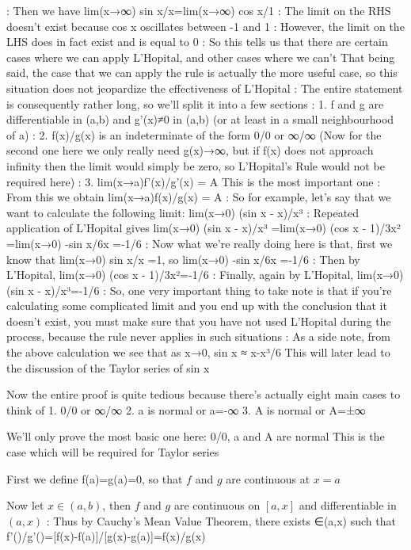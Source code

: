:
Then we have
lim(x→∞) sin x/x=lim(x→∞) cos x/1
:
The limit on the RHS doesn't exist because cos x oscillates between -1 and 1
:
However, the limit on the LHS does in fact exist and is equal to 0
:
So this tells us that there are certain cases where we can apply L'Hopital, and other cases where we can't
That being said, the case that we can apply the rule is actually the more useful case, so this situation does not jeopardize the effectiveness of L'Hopital
:
The entire statement is consequently rather long, so we'll split it into a few sections
:
1. f and g are differentiable in (a,b) and g'(x)≠0 in (a,b) (or at least in a small neighbourhood of a)
:
2. f(x)/g(x) is an indeterminate of the form 0/0 or ∞/∞ (Now for the second one here we only really need g(x)→∞, but if f(x) does not approach infinity then the limit would simply be zero, so L'Hopital's Rule would not be required here)
:
3. lim(x→a)f'(x)/g'(x) = A
This is the most important one
:
From this we obtain lim(x→a)f(x)/g(x) = A
:
So for example, let's say that we want to calculate the following limit:
lim(x→0) (sin x - x)/x³
:
Repeated application of L'Hopital gives
lim(x→0) (sin x - x)/x³
=lim(x→0) (cos x - 1)/3x²
=lim(x→0) -sin x/6x =-1/6
:
Now what we're really doing here is that, first we know that lim(x→0) sin x/x =1, so lim(x→0) -sin x/6x =-1/6
:
Then by L'Hopital, lim(x→0) (cos x - 1)/3x²=-1/6
:
Finally, again by L'Hopital, lim(x→0) (sin x - x)/x³=-1/6
:
So, one very important thing to take note is that if you're calculating some complicated limit and you end up with the conclusion that it doesn't exist, you must make sure that you have not used L'Hopital during the process, because the rule never applies in such situations
:
As a side note, from the above calculation we see that as x→0, sin x ≈ x-x³/6
This will later lead to the discussion of the Taylor series of sin x

Now the entire proof is quite tedious because there's actually eight main cases to think of
1. 0/0 or ∞/∞
2. a is normal or a=-∞
3. A is normal or A=±∞

We'll only prove the most basic one here:
0/0, a and A are normal
This is the case which will be required for Taylor series

First we define f(a)=g(a)=0, so that $f$ and $g$ are continuous at $x=a$

Now let $x\in(a,b)$, then $f$ and $g$ are continuous on $[a,x]$ and differentiable in $(a,x)$
:
Thus by Cauchy's Mean Value Theorem, there exists \xi∈(a,x) such that
f'(\xi)/g'(\xi)=[f(x)-f(a)]/[g(x)-g(a)]=f(x)/g(x)

